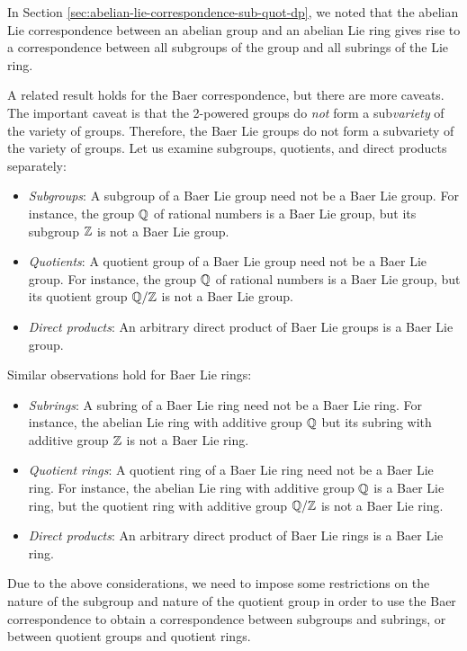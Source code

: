 In Section \ref{sec:abelian-lie-correspondence-sub-quot-dp}, we noted
that the abelian Lie correspondence between an abelian group and an
abelian Lie ring gives rise to a correspondence between all subgroups
of the group and all subrings of the Lie ring.

A related result holds for the Baer correspondence, but there are more
caveats. The important caveat is that the 2-powered groups do {\em
  not} form a sub{\em variety} of the variety of groups. Therefore,
the Baer Lie groups do not form a subvariety of the variety of
groups. Let us examine subgroups, quotients, and direct products
separately:

\begin{itemize}
\item {\em Subgroups}: A subgroup of a Baer Lie group need not be a
  Baer Lie group. For instance, the group $\mathbb{Q}$ of rational numbers is
  a Baer Lie group, but its subgroup $\mathbb{Z}$ is not a Baer Lie group.
\item {\em Quotients}: A quotient group of a Baer Lie group need not
  be a Baer Lie group. For instance, the group $\mathbb{Q}$ of rational
  numbers is a Baer Lie group, but its quotient group $\mathbb{Q}/\mathbb{Z}$ is not a
  Baer Lie group.
\item {\em Direct products}: An arbitrary direct product of Baer Lie
  groups is a Baer Lie group.
\end{itemize}

Similar observations hold for Baer Lie rings:

\begin{itemize}
\item {\em Subrings}: A subring of a Baer Lie ring need not be a Baer
  Lie ring. For instance, the abelian Lie ring with additive group
  $\mathbb{Q}$ but its subring with additive group $\mathbb{Z}$ is not a Baer Lie ring.
\item {\em Quotient rings}: A quotient ring of a Baer Lie ring need
  not be a Baer Lie ring. For instance, the abelian Lie ring with
  additive group $\mathbb{Q}$ is a Baer Lie ring, but the quotient ring with
  additive group $\mathbb{Q}/\mathbb{Z}$ is not a Baer Lie ring.
\item {\em Direct products}: An arbitrary direct product of Baer Lie
  rings is a Baer Lie ring.
\end{itemize}

Due to the above considerations, we need to impose some restrictions
on the nature of the subgroup and nature of the quotient group in
order to use the Baer correspondence to obtain a correspondence
between subgroups and subrings, or between quotient groups and
quotient rings.

